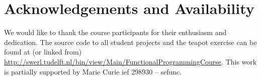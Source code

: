 \documentclass[conference]{IEEEtran}
\begin{document}
\section*{Acknowledgements and Availability}
We would like to thank the course participants for their enthusiasm and
dedication. The source code to all student projects and the teapot
exercise can be found at (or linked from) \url{http://swerl.tudelft.nl/bin/view/Main/FunctionalProgrammingCourse}. This work is partially supported by
Marie Curie {\sc ief} 298930 -- {\sc sefunc}.



\end{document}
